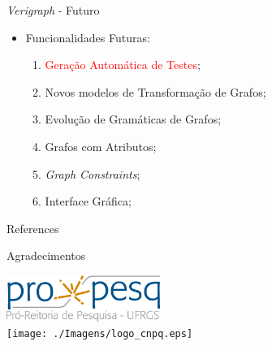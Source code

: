 \documentclass[xcolor=dvipsnames,pdf,10pt]{beamer}
\newcommand{\bi}{\begin{itemize}}
\newcommand{\ei}{\end{itemize}}
\newcommand{\be}{\begin{enumerate}}
\newcommand{\ee}{\end{enumerate}}
\newcommand{\tm}{\item}
\begin{document}
\begin{frame}{\textit{Verigraph} - Futuro}

\bi
    \tm Funcionalidades Futuras: \\
        \be
            \tm \textcolor{red}{Geração Automática de Testes};
            \tm Novos modelos de Transformação de Grafos;
            \tm Evolução de Gramáticas de Grafos;
            \tm Grafos com Atributos;
            \tm \textit{Graph Constraints};
            \tm Interface Gráfica;
            
        \ee
\ei
\end{frame}



\begin{frame}{References}
\nocite{*}
    \begingroup
        \renewcommand{\section}[2]{}
            
            
    \endgroup
\end{frame}

\begin{frame}{Agradecimentos}

\centering

\includegraphics[width=5cm, keepaspectratio]{./Imagens/logo-propesq.png} \\
\vspace{1cm}
\texttt{[image: ./Imagens/logo\_cnpq.eps]}


\end{frame}

\titlepageINF
\end{document}
